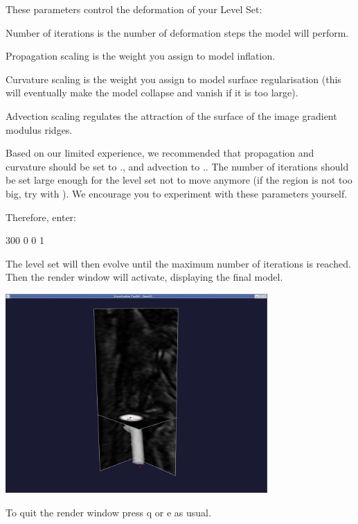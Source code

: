These parameters control the deformation of your Level Set\+:


\begin{DoxyItemize}
\item Number of iterations is the number of deformation steps the model will perform.
\item Propagation scaling is the weight you assign to model inflation.
\item Curvature scaling is the weight you assign to model surface regularisation (this will eventually make the model collapse and vanish if it is too large).
\item Advection scaling regulates the attraction of the surface of the image gradient modulus ridges.
\end{DoxyItemize}

Based on our limited experience, we recommended that propagation and curvature should be set to {.}, and advection to {.}. The number of iterations should be set large enough for the level set not to move anymore (if the region is not too big, try with {}). We encourage you to experiment with these parameters yourself.

Therefore, enter\+: 
\begin{DoxyCode}
300 0 0 1
\end{DoxyCode}


The level set will then evolve until the maximum number of iterations is reached. Then the render window will activate, displaying the final model.

 
\begin{DoxyImageNoCaption}
  \mbox{\includegraphics[width=0.75\textwidth]{curvature0x0}}
\end{DoxyImageNoCaption}


To quit the render window press {\ttfamily q} or {\ttfamily e} as usual.

